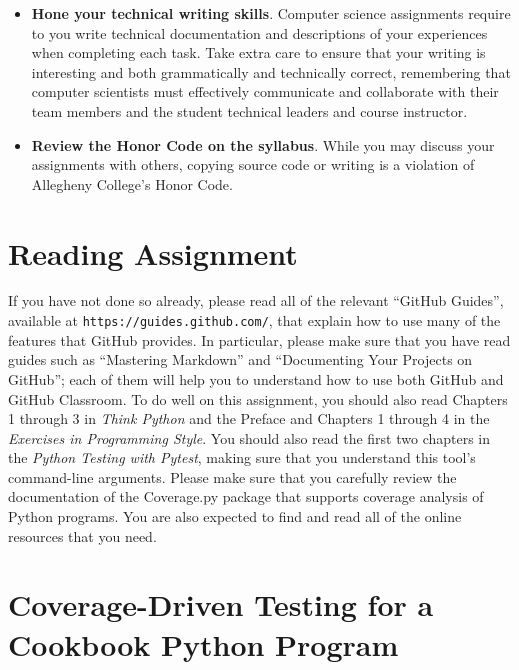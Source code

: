 \documentclass[11pt]{article}
\newcommand{\pytest}{{\em Python Testing with Pytest\/}}
\newcommand{\url}[1]{\lstinline{#1}}
\begin{document}
\begin{itemize}
\item {\bf Hone your technical writing skills}. Computer science assignments
  require to you write technical documentation and descriptions of your
  experiences when completing each task. Take extra care to ensure that your
  writing is interesting and both grammatically and technically correct,
  remembering that computer scientists must effectively communicate and
  collaborate with their team members and the student technical leaders and
  course instructor.

\item {\bf Review the Honor Code on the syllabus}. While you may discuss your
  assignments with others, copying source code or writing is a violation of
  Allegheny College's Honor Code.

\end{itemize}

\section*{Reading Assignment}

If you have not done so already, please read all of the relevant ``GitHub
Guides'', available at \url{https://guides.github.com/}, that explain how to use
many of the features that GitHub provides. In particular, please make sure that
you have read guides such as ``Mastering Markdown'' and ``Documenting Your
Projects on GitHub''; each of them will help you to understand how to use both
GitHub and GitHub Classroom. To do well on this assignment, you should also read
Chapters 1 through 3 in {\em Think Python\/} and the Preface and Chapters 1
through 4 in the {\em Exercises in Programming Style\/}.
%
You should also read the first two chapters in the \pytest, making sure that you
understand this tool's command-line arguments.
%
Please make sure that you carefully review the documentation of the Coverage.py
package that supports coverage analysis of Python programs.
%
You are also expected to find and read all of the online resources that you
need.


\section*{Coverage-Driven Testing for a Cookbook Python Program}
\end{document}
